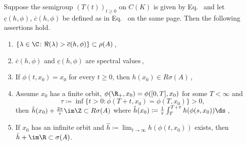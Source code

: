 \begin{proposition}\label{prop:b3-4.8}
Suppose the semigroup $(T(t))_{t\geq 0}$ on $C(K)$ is given by 
Eq.~ and let $\underline{c}(h,\phi)$, $\overline{c}(h,\phi)$ be defined as in Eq.~ on the same page.
Then the following assertions hold.
\begin{enumerate}[\upshape (i)]
\item 
	$\{\lambda \in \C \colon \Re(\lambda) > \overline{c}(h,\phi)\} \subset \rho(A)$\,,
		
\item 
	$\overline{c}(h,\phi)$ and $\underline{c}(h,\phi)$ are spectral values\,,
		
\item 
	If\/ $\phi(t,x_{0}) = x_{0}$ for every $t \geq 0$, then $h(x_{0}) \in R{\sigma}(A)$\,,
		
\item 
Assume $x_{0}$ has a finite orbit, \ie $\phi(\R_{+},x_{0}) = \phi([0,T],x_{0})$ for some $T < \infty$ and 
\[
\tau \coloneq \inf\{t > 0 \colon \phi(T+t,x_{0}) = \phi(T,x_{0})\} > 0, 
\]
then $\hat{h}(x_{0}) + \frac{2\pi}{\tau}\im\Z \subset R{\sigma}(A)$ where $\hat{h}(x_{0}) \coloneq \frac{1}{\tau}\int_{T}^{T+\tau}h(\phi(s,x_{0}))\ds $\,,
		
\item 
	If\/ $x_{0}$ has an infinite orbit and 
	$\hat{h} \coloneq  \lim_{t\to\infty}h(\phi(t,x_{0}))$ exists, 
	then $\hat{h} + \im\R \subset \sigma(A)$.
\end{enumerate}
\end{proposition}
